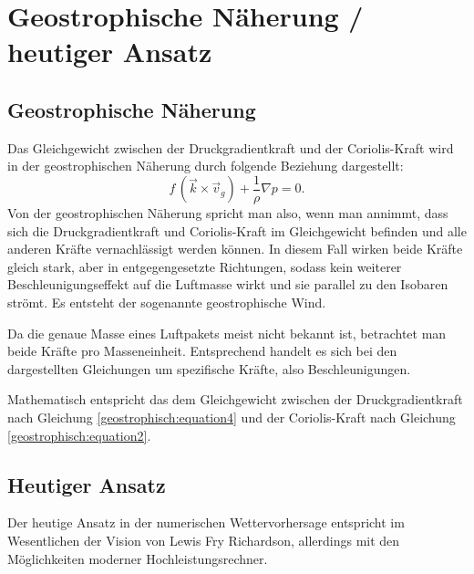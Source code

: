 %
%
%
%
\section{Geostrophische Näherung / heutiger Ansatz
\label{geostrophisch:section:geoNäherung}}
\subsection{Geostrophische Näherung}
Das Gleichgewicht zwischen der Druckgradientkraft und der Coriolis-Kraft wird in der geostrophischen Näherung durch folgende Beziehung dargestellt:
%
\begin{equation}
f\, (\vec{k} \times \vec{v}_g) 
+
\frac{1}{\rho} \nabla p
=
0.
\label{geostrophisch:equation5}
\end{equation}
Von der geostrophischen Näherung spricht man also, wenn man annimmt, dass sich die Druckgradientkraft und Coriolis-Kraft im Gleichgewicht befinden und alle anderen Kräfte vernachlässigt werden können. In diesem Fall wirken beide Kräfte gleich stark, aber in entgegengesetzte Richtungen, sodass kein weiterer Beschleunigungseffekt auf die Luftmasse wirkt und sie parallel zu den Isobaren strömt. Es entsteht der sogenannte geostrophische Wind.

\vspace{1em}

Da die genaue Masse eines Luftpakets meist nicht bekannt ist, betrachtet man beide Kräfte pro Masseneinheit. Entsprechend handelt es sich bei den dargestellten Gleichungen um spezifische Kräfte, also Beschleunigungen.

\vspace{1em}

Mathematisch entspricht das dem Gleichgewicht zwischen der Druckgradientkraft nach Gleichung \eqref{geostrophisch:equation4} und der Coriolis-Kraft nach Gleichung \eqref{geostrophisch:equation2}.

\subsection{Heutiger Ansatz}

Der heutige Ansatz in der numerischen Wettervorhersage entspricht im Wesentlichen der Vision von Lewis Fry Richardson, allerdings mit den Möglichkeiten moderner Hochleistungsrechner.
%

